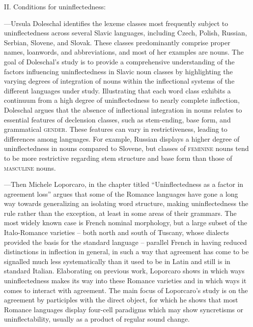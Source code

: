 \documentclass[output=paper]{langscibook}
\begin{document}
\medskip

\noindent II. Conditions for uninflectedness:

\medskip

---Ursula Doleschal identifies the lexeme classes most frequently subject to uninflectedness across several Slavic languages, including Czech, Polish, Russian, Serbian, Slovene, and Slovak. These classes predominantly comprise proper names, loanwords, and abbreviations, and most of her examples are nouns. The goal of Doleschal's study is to provide a comprehensive understanding of the factors influencing uninflectedness in Slavic noun classes by highlighting the varying degrees of integration of nouns within the inflectional systems of the different languages under study. Illustrating that each word class exhibits a continuum from a high degree of uninflectedness to nearly complete inflection, Doleschal argues that the absence of inflectional integration in nouns relates to essential features of declension classes, such as stem-ending, base form, and grammatical \textsc{gender}. These features can vary in restrictiveness, leading to differences among languages. For example, Russian displays a higher degree of uninflectedness in nouns compared to Slovene, but classes of \textsc{feminine} nouns tend to be more restrictive regarding stem structure and base form than those of \textsc{masculine} nouns.

---Then Michele Loporcaro, in the chapter titled ``Uninflectedness as a factor in agreement loss'' argues that some of the Romance languages have gone a long way towards generalizing an isolating word structure, making uninflectedness the rule rather than the exception, at least in some areas of their grammars. The most widely known case is French nominal morphology, but a large subset of the Italo-Romance varieties -- both north and south of Tuscany, whose dialects provided the basis for the standard language -- parallel French in having reduced distinctions in inflection in general, in such a way that agreement has come to be signalled much less systematically than it used to be in Latin and still is in standard Italian. Elaborating on previous work, Loporcaro shows in which ways uninflectedness makes its way into these Romance varieties and in which ways it comes to interact with agreement. The main focus of Loporcaro's study is on the agreement by participles with the direct object, for which he shows that most Romance languages display four-cell paradigms which may show syncretisms or uninflectability, usually as a product of regular sound change.
\end{document}

